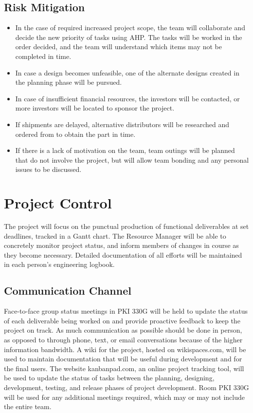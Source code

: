 \documentclass[11pt]{report}
\begin{document}
\subsection{Risk Mitigation}
\begin{itemize}
	\item In the case of required increased project scope, the team will collaborate and decide the new priority of tasks using AHP. The tasks will be worked in the order decided, and the team will understand which items may not be completed in time.
	\item In case a design becomes unfeasible, one of the alternate designs created in the planning phase will be pursued.
	\item In case of insufficient financial resources, the investors will be contacted, or more investors will be located to sponsor the project.
	\item If shipments are delayed, alternative distributors will be researched and ordered from to obtain the part in time.
	\item If there is a lack of motivation on the team, team outings will be planned that do not involve the project, but will allow team bonding and any personal issues to be discussed.
\end{itemize}

\section{Project Control}
The project will focus on the punctual production of functional deliverables at set deadlines, tracked in a Gantt chart.
The Resource Manager will be able to concretely monitor project status, and inform members of changes in course as they become necessary.
Detailed documentation of all efforts will be maintained in each person's engineering logbook.

\subsection{Communication Channel}
Face-to-face group status meetings in PKI 330G will be held to update the status of each deliverable being worked on and provide proactive feedback to keep the project on track.
As much communication as possible should be done in person, as opposed to through phone, text, or email conversations because of the higher information bandwidth.
A wiki for the project, hosted on wikispaces.com, will be used to maintain documentation that will be useful during development and for the final users. 
The website kanbanpad.com, an online project tracking tool, will be used to update the status of tasks between the planning, designing, development, testing, and release phases of project development.
Room PKI 330G will be used for any additional meetings required, which may or may not include the entire team.
\end{document}
